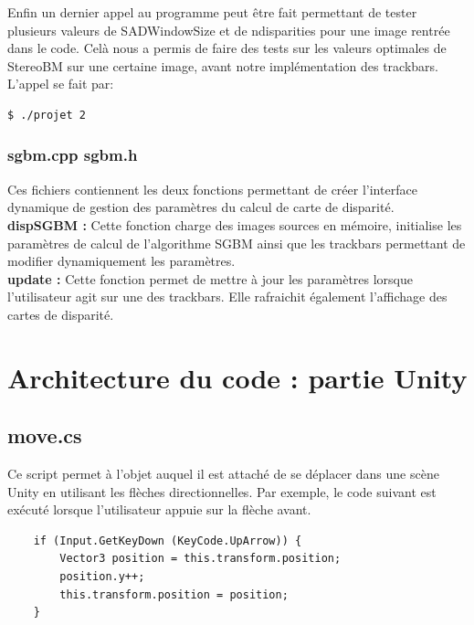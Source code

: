 \documentclass[a4paper]{article}
\begin{document}
Enfin un dernier appel au programme peut être fait permettant de tester plusieurs valeurs de SADWindowSize et de ndisparities pour une image rentrée dans le code. Celà nous a permis de faire des tests sur les valeurs optimales de StereoBM sur une certaine image, avant notre implémentation des trackbars. L'appel se fait par:
\begin{verbatim}
$ ./projet 2
\end{verbatim}

\subsubsection*{sgbm.cpp sgbm.h}

Ces fichiers contiennent les deux fonctions permettant de créer l'interface dynamique
de gestion des paramètres du calcul de carte de disparité. \\
\textbf{dispSGBM :} Cette fonction charge des images sources en mémoire, initialise
les paramètres de calcul de l'algorithme SGBM ainsi que les trackbars permettant de
modifier dynamiquement les paramètres. \\
\textbf{update :} Cette fonction permet de mettre à jour les paramètres lorsque
l'utilisateur agit sur une des trackbars. Elle rafraichit également l'affichage des
cartes de disparité.


\newpage
\section{Architecture du code : partie Unity}

\subsection*{move.cs}

Ce script permet à l'objet auquel il est attaché de se déplacer dans une scène
Unity en utilisant les flèches directionnelles. Par exemple, le code suivant est
exécuté lorsque l'utilisateur appuie sur la flèche avant.
\begin{verbatim}
	if (Input.GetKeyDown (KeyCode.UpArrow)) {
		Vector3 position = this.transform.position;
		position.y++;
		this.transform.position = position;
	}
\end{verbatim}
\end{document}
